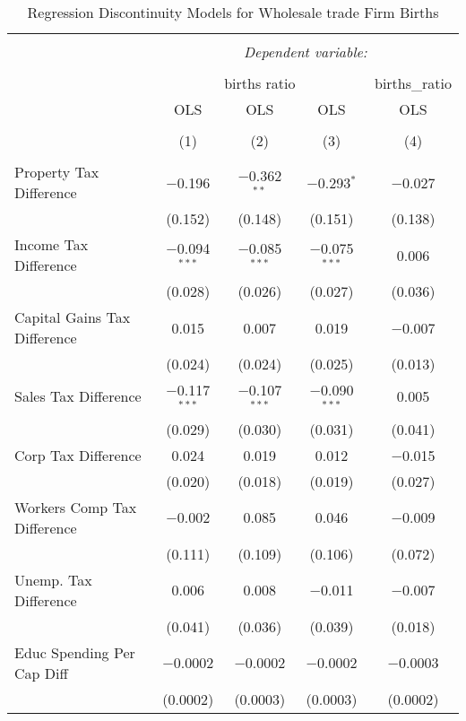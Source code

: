 
\begin{table}[!htbp] \centering 
  \caption{Regression Discontinuity Models for  Wholesale trade Firm Births} 
  \label{42rd} 
\begin{tabular}{@{\extracolsep{5pt}}lcccc} 
\\[-1.8ex]\hline 
\hline \\[-1.8ex] 
 & \multicolumn{4}{c}{\textit{Dependent variable:}} \\ 
\cline{2-5} 
\\[-1.8ex] & \multicolumn{3}{c}{births ratio} & births\_ratio \\ 
 & OLS & OLS & OLS & OLS \\ 
\\[-1.8ex] & (1) & (2) & (3) & (4)\\ 
\hline \\[-1.8ex] 
 Property Tax Difference & $-$0.196 & $-$0.362$^{**}$ & $-$0.293$^{*}$ & $-$0.027 \\ 
  & (0.152) & (0.148) & (0.151) & (0.138) \\ 
  Income Tax Difference & $-$0.094$^{***}$ & $-$0.085$^{***}$ & $-$0.075$^{***}$ & 0.006 \\ 
  & (0.028) & (0.026) & (0.027) & (0.036) \\ 
  Capital Gains Tax Difference & 0.015 & 0.007 & 0.019 & $-$0.007 \\ 
  & (0.024) & (0.024) & (0.025) & (0.013) \\ 
  Sales Tax Difference & $-$0.117$^{***}$ & $-$0.107$^{***}$ & $-$0.090$^{***}$ & 0.005 \\ 
  & (0.029) & (0.030) & (0.031) & (0.041) \\ 
  Corp Tax Difference & 0.024 & 0.019 & 0.012 & $-$0.015 \\ 
  & (0.020) & (0.018) & (0.019) & (0.027) \\ 
  Workers Comp Tax Difference & $-$0.002 & 0.085 & 0.046 & $-$0.009 \\ 
  & (0.111) & (0.109) & (0.106) & (0.072) \\ 
  Unemp. Tax Difference & 0.006 & 0.008 & $-$0.011 & $-$0.007 \\ 
  & (0.041) & (0.036) & (0.039) & (0.018) \\ 
  Educ Spending Per Cap Diff & $-$0.0002 & $-$0.0002 & $-$0.0002 & $-$0.0003 \\ 
  & (0.0002) & (0.0003) & (0.0003) & (0.0002) \\ 

\end{tabular}
\end{table}
